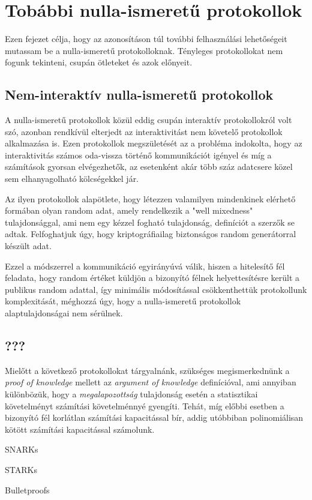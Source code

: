 \chapter{Tobábbi nulla-ismeretű protokollok}

Ezen fejezet célja, hogy az azonosításon túl további felhasználási lehetőségeit mutassam be a nulla-ismeretű protokolloknak. Tényleges protokollokat nem fogunk tekinteni, csupán ötleteket és azok előnyeit.

\section*{Nem-interaktív nulla-ismeretű protokollok}

A nulla-ismeretű protokollok közül eddig csupán interaktív protokollokról volt szó, azonban rendkívül elterjedt az interaktivitást nem követelő protokollok alkalmazása is. Ezen protokollok megszületését az a probléma indokolta, hogy az interaktivitás számos oda-vissza történő kommunikációt igényel és míg a számítások gyorsan elvégezhetők, az esetenként akár több száz adatcsere közel sem elhanyagolható kölcségekkel jár. 

Az ilyen protokollok \cite{NIZK, NIZK2} alapötlete, hogy létezzen valamilyen mindenkinek elérhető formában olyan random adat, amely rendelkezik a "well mixedness" tulajdonsággal, ami nem egy kézzel fogható tulajdonság, definíciót a szerzők se adtak. Felfoghatjuk úgy, hogy kriptográfiailag biztonságos random generátorral készült adat.

Ezzel a módszerrel a kommunikáció egyirányúvá válik, hiszen a hitelesítő fél feladata, hogy random értéket küldjön a bizonyító félnek helyettesítésre került a publikus random adattal, így minimális módosítással csökkenthettük protokollunk komplexitását, méghozzá úgy, hogy a nulla-ismeretű protokollok alaptulajdonságai nem sérülnek.

\section*{???}

Mielőtt a következő protokollokat tárgyalnánk, szükséges megismerkednünk a \textit{proof of knowledge} mellett az \textit{argument of knowledge} definícióval, ami annyiban különbözük, hogy a \textit{megalapozottság} tulajdonság esetén a statisztikai követelményt számítási követelménnyé gyengíti. Tehát, míg előbbi esetben a bizonyító fél korlátlan számítási kapacitással bír, addig utóbbiban polinomiálisan kötött számítási kapacitással számolunk.

SNARKs \cite{SNARK}

STARKs \cite{STARK}

Bulletproofs \cite{BULLETPROOF}